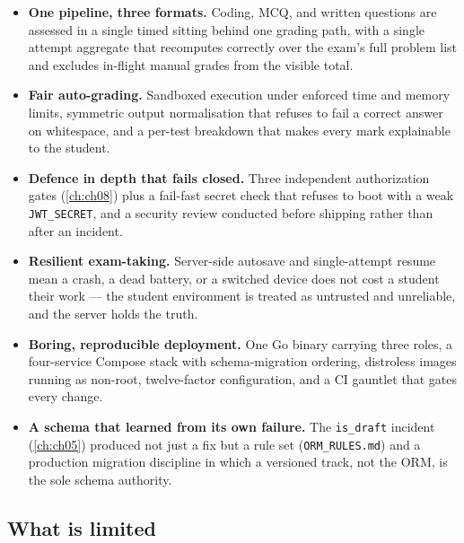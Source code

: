 \begin{itemize}[leftmargin=1.4em]
  \item \textbf{One pipeline, three formats.} Coding, MCQ, and written questions are
        assessed in a single timed sitting behind one grading path, with a single
        attempt aggregate that recomputes correctly over the exam's full problem list
        and excludes in-flight manual grades from the visible total.
  \item \textbf{Fair auto-grading.} Sandboxed execution under enforced time and
        memory limits, symmetric output normalisation that refuses to fail a correct
        answer on whitespace, and a per-test breakdown that makes every mark
        explainable to the student.
  \item \textbf{Defence in depth that fails closed.} Three independent authorization
        gates (\cref{ch:ch08}) plus a fail-fast secret check that refuses to boot with
        a weak \texttt{JWT\_SECRET}, and a security review conducted before shipping
        rather than after an incident.
  \item \textbf{Resilient exam-taking.} Server-side autosave and single-attempt
        resume mean a crash, a dead battery, or a switched device does not cost a
        student their work --- the student environment is treated as untrusted and
        unreliable, and the server holds the truth.
  \item \textbf{Boring, reproducible deployment.} One Go binary carrying three roles,
        a four-service Compose stack with schema-migration ordering, distroless images
        running as non-root, twelve-factor configuration, and a CI gauntlet that gates
        every change.
  \item \textbf{A schema that learned from its own failure.} The \texttt{is\_draft}
        incident (\cref{ch:ch05}) produced not just a fix but a rule set
        (\texttt{ORM\_RULES.md}) and a production migration discipline in which a
        versioned track, not the ORM, is the sole schema authority.
\end{itemize}

\subsection*{What is limited}

